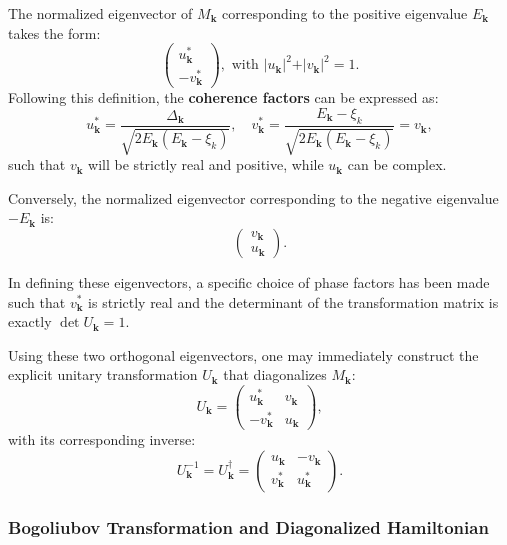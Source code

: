 The normalized eigenvector of \( M_{\mathbf{k}} \) corresponding to the positive eigenvalue \( E_{\mathbf{k}} \) takes the form:
\[
    \begin{pmatrix} u_{\mathbf{k}}^* \\ -v_{\mathbf{k}}^* \end{pmatrix}, \text{ with } \vert u_{\mathbf{k}} \vert^2 + \vert v_{\mathbf{k}} \vert^2 = 1.
\]
Following this definition, the \textbf{coherence factors} can be expressed as:
\[
    u_{\mathbf{k}}^* = \frac{\Delta_{\mathbf{k}}}{\sqrt{2E_{\mathbf{k}}(E_{\mathbf{k}} - \xi_k)}}, \quad v_{\mathbf{k}}^* = \frac{E_{\mathbf{k}} - \xi_k}{\sqrt{2E_{\mathbf{k}}(E_{\mathbf{k}} - \xi_k)}} = v_{\mathbf{k}},
\]
such that \(v_{\mathbf{k}} \) will be strictly real and positive, while \(u_{\mathbf{k}}\) can be complex.

Conversely, the normalized eigenvector corresponding to the negative eigenvalue \( -E_{\mathbf{k}} \) is:
\[
    \begin{pmatrix} v_{\mathbf{k}} \\ u_{\mathbf{k}} \end{pmatrix}.
\]
\begin{remark}
    In defining these eigenvectors, a specific choice of phase factors has been made such that \( v_{\mathbf{k}}^* \) is strictly real and the determinant of the transformation matrix is exactly \( \det U_{\mathbf{k}} = 1 \).
\end{remark}
Using these two orthogonal eigenvectors, one may immediately construct the explicit unitary transformation \( U_{\mathbf{k}} \) that diagonalizes \( M_{\mathbf{k}} \):
\[
    U_{\mathbf{k}} = \begin{pmatrix} u_{\mathbf{k}}^* & v_{\mathbf{k}} \\ -v_{\mathbf{k}}^* & u_{\mathbf{k}} \end{pmatrix},
\]
with its corresponding inverse:
\[
    U_{\mathbf{k}}^{-1} = U_{\mathbf{k}}^\dagger = \begin{pmatrix} u_{\mathbf{k}} & -v_{\mathbf{k}} \\ v_{\mathbf{k}}^* & u_{\mathbf{k}}^* \end{pmatrix}.
\]

\subsubsection{Bogoliubov Transformation and Diagonalized Hamiltonian}

